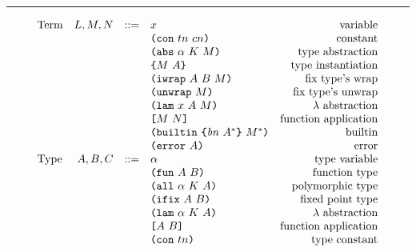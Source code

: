 \documentclass[../zerepoch-core-specification.tex]{subfiles}
\begin{document}
\medskip\hrule\medskip

\begin{minipage}{\linewidth}
    \centering
    \[\begin{array}{lrclr}
        \textrm{Term}             & L,M,N  & ::= & x                          & \textrm{variable}\\
                                  &        &     & \texttt{(} \texttt{con} ~ tn ~ cn \texttt{)}               & \textrm{constant}\\
                                  &        &     & \texttt{(} \texttt{abs} ~ \alpha ~ K ~ M \texttt{)}         & \textrm{type abstraction}\\
                                  &        &     & \texttt{\{}M ~ A\texttt{\}}                & \textrm{type instantiation}\\
                                  &        &     & \texttt{(} \texttt{iwrap} ~ A ~ B ~ M \texttt{)}            & \textrm{fix type's wrap}\\
                                  &        &     & \texttt{(} \texttt{unwrap} ~ M \texttt{)}                 & \textrm{fix type's unwrap}\\
                                  &        &     & \texttt{(} \texttt{lam} ~ x ~ A ~ M \texttt{)}              & \textrm{$\lambda$ abstraction}\\
                                  &        &     & \texttt{[} M ~ N \texttt{]}                 & \textrm{function application}\\
                                  &        &     & \texttt{(} \texttt{builtin} ~ \texttt{\{} \mathit{bn} ~ A^* \texttt{\}} ~ M^* \texttt{)}     & \textrm{builtin}\\
                                  &        &     & \texttt{(} \texttt{error} ~ A \texttt{)}                  & \textrm{error}\\
        \textrm{Type}             & A,B,C  & ::= & \alpha                     & \textrm{type variable}\\
                                  &        &     & \texttt{(} \texttt{fun} ~ A ~ B \texttt{)}                & \textrm{function type}\\
                                  &        &     & \texttt{(} \texttt{all} ~ \alpha ~ K ~ A \texttt{)}        & \textrm{polymorphic type}\\
                                  &        &     & \texttt{(} \texttt{ifix} ~ A ~ B \texttt{)}                & \textrm{fixed point type}\\
                                  &        &     & \texttt{(} \texttt{lam} ~ \alpha ~ K ~ A \texttt{)}        & \textrm{$\lambda$ abstraction}\\
                                  &        &     & \texttt{[} A ~ B \texttt{]}                & \textrm{function application}\\
                                  &        &     & \texttt{(} \texttt{con} ~ tn \texttt{)}                  & \textrm{type constant}\\

\end{array}\]
\end{minipage}
\end{document}
